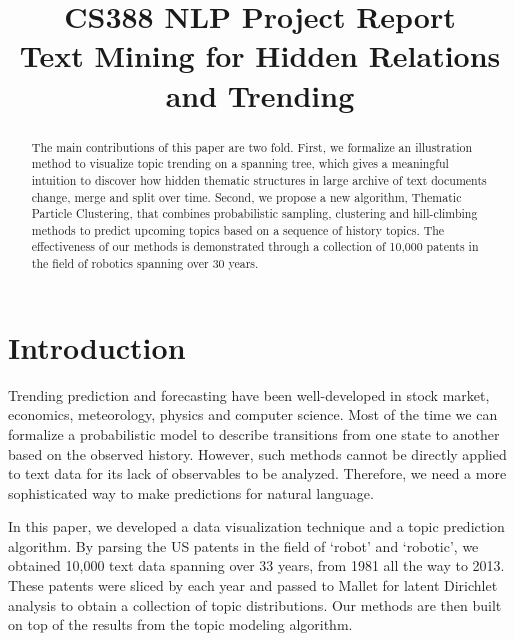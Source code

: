\documentclass[conference]{IEEEtran}
\begin{document}
\title{\large{CS388 NLP Project Report}\\ \huge{Text Mining for Hidden Relations and Trending}}

\author{
\and
{}
}
\maketitle
\onehalfspace
\begin{abstract}
The main contributions of this paper are two fold. First, we formalize an illustration method to visualize topic trending on a spanning tree, which gives a meaningful intuition to discover how hidden thematic structures in large archive of text documents change, merge and split over time. Second, we propose a new algorithm, Thematic Particle Clustering, that combines probabilistic sampling, clustering and hill-climbing methods to predict upcoming topics based on a sequence of history topics. The effectiveness of our methods is demonstrated through a collection of 10,000 patents in the field of robotics spanning over 30 years.
\end{abstract}

\section{Introduction}

Trending prediction and forecasting have been well-developed in stock market, economics, meteorology, physics and computer science. Most of the time we can formalize a probabilistic model to describe transitions from one state to another based on the observed history. However, such methods cannot be directly applied to text data for its lack of observables to be analyzed. Therefore, we need a more sophisticated way to make predictions for natural language.

In this paper, we developed a data visualization technique and a topic prediction algorithm. By parsing the US patents in the field of `robot' and `robotic', we obtained 10,000 text data spanning over 33 years, from 1981 all the way to 2013. These patents were sliced by each year and passed to Mallet \cite{mallet} for latent Dirichlet analysis \cite{lda2003} to obtain a collection of topic distributions. Our methods are then built on top of the results from the topic modeling algorithm.
\end{document}
